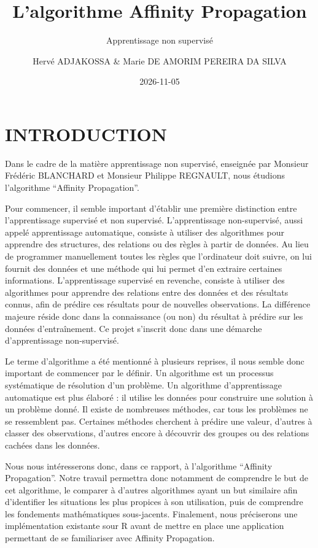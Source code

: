\documentclass[
  letterpaper,
  DIV=11,
  numbers=noendperiod]{scrartcl}
\title{L'algorithme Affinity Propagation}
\subtitle{Apprentissage non supervisé}
\author{Hervé ADJAKOSSA \& Marie DE AMORIM PEREIRA DA SILVA}
\date{2026-11-05}
\begin{document}
\maketitle


\newpage

\section{INTRODUCTION}\label{introduction}

Dans le cadre de la matière apprentissage non supervisé, enseignée par
Monsieur Frédéric BLANCHARD et Monsieur Philippe REGNAULT, nous étudions
l'algorithme ``Affinity Propagation''.

Pour commencer, il semble important d'établir une première distinction
entre l'apprentissage supervisé et non supervisé. L'apprentissage
non-supervisé, aussi appelé apprentissage automatique, consiste à
utiliser des algorithmes pour apprendre des structures, des relations ou
des règles à partir de données. Au lieu de programmer manuellement
toutes les règles que l'ordinateur doit suivre, on lui fournit des
données et une méthode qui lui permet d'en extraire certaines
informations. L'apprentissage supervisé en revenche, consiste à utiliser
des algorithmes pour apprendre des relations entre des données et des
résultats connus, afin de prédire ces résultats pour de nouvelles
observations. La différence majeure réside donc dans la connaissance (ou
non) du résultat à prédire sur les données d'entraînement. Ce projet
s'inscrit donc dans une démarche d'apprentissage non-supervisé.

Le terme d'algorithme a été mentionné à plusieurs reprises, il nous
semble donc important de commencer par le définir. Un algorithme est un
processus systématique de résolution d'un problème. Un algorithme
d'apprentissage automatique est plus élaboré : il utilise les données
pour construire une solution à un problème donné. Il existe de
nombreuses méthodes, car tous les problèmes ne se ressemblent pas.
Certaines méthodes cherchent à prédire une valeur, d'autres à classer
des observations, d'autres encore à découvrir des groupes ou des
relations cachées dans les données.

Nous nous intéresserons donc, dans ce rapport, à l'algorithme ``Affinity
Propagation''. Notre travail permettra donc notamment de comprendre le
but de cet algorithme, le comparer à d'autres algorithmes ayant un but
similaire afin d'identifier les situations les plus propices à son
utilisation, puis de comprendre les fondements mathématiques
sous-jacents. Finalement, nous préciserons une implémentation existante
sour R avant de mettre en place une application permettant de se
familiariser avec Affinity Propagation.
\end{document}
